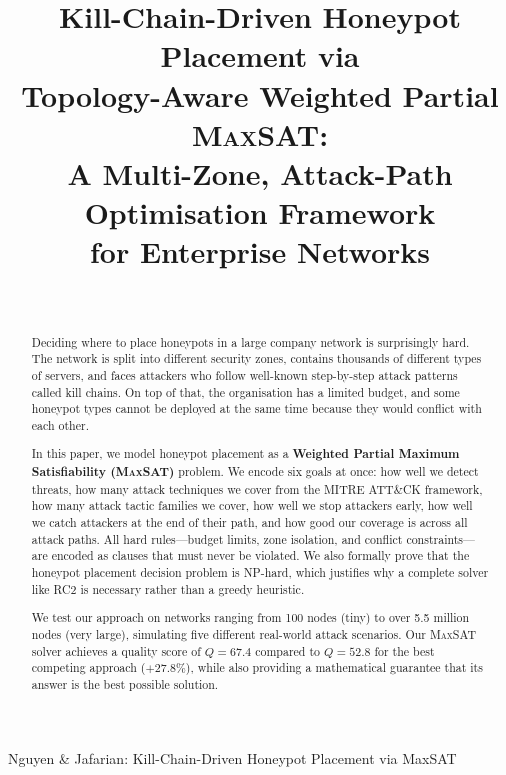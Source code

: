 \documentclass[journal]{IEEEtran}
\newcommand{\maxsat}{\textsc{MaxSAT}}
\begin{document}
\title{Kill-Chain-Driven Honeypot Placement via\\
       Topology-Aware Weighted Partial \textsc{MaxSAT}:\\
       A Multi-Zone, Attack-Path Optimisation Framework\\
       for Enterprise Networks}

\author{%
  \\
}

%
{Nguyen \& Jafarian: Kill-Chain-Driven Honeypot Placement via MaxSAT}

\maketitle

\begin{abstract}
Deciding where to place honeypots in a large company network
is surprisingly hard.
The network is split into different security zones, contains
thousands of different types of servers, and faces attackers
who follow well-known step-by-step attack patterns called
kill chains.
On top of that, the organisation has a limited budget, and
some honeypot types cannot be deployed at the same time
because they would conflict with each other.

In this paper, we model honeypot placement as a
\textbf{Weighted Partial Maximum Satisfiability (\maxsat{})}
problem.
We encode six goals at once: how well we detect threats,
how many attack techniques we cover from the MITRE ATT\&CK
framework, how many attack tactic families we cover, how well
we stop attackers early, how well we catch attackers at the
end of their path, and how good our coverage is across all
attack paths.
All hard rules---budget limits, zone isolation, and conflict
constraints---are encoded as clauses that must never be
violated.
We also formally prove that the honeypot placement decision
problem is NP-hard, which justifies why a complete solver
like RC2 is necessary rather than a greedy heuristic.

We test our approach on networks ranging from 100 nodes
(tiny) to over 5.5 million nodes (very large), simulating
five different real-world attack scenarios.
Our \maxsat{} solver achieves a quality score of $Q=67.4$
compared to $Q=52.8$ for the best competing approach
($+27.8\%$), while also providing a mathematical guarantee
that its answer is the best possible solution.
\end{abstract}
\end{document}
